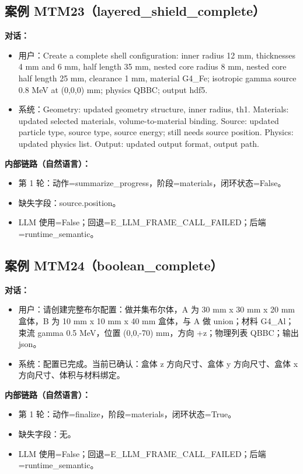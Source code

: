 \documentclass[11pt]{ctexart}
\begin{document}
\subsection{案例 MTM23（layered\_shield\_complete）}
\textbf{对话：}
\begin{itemize}
\item 用户：Create a complete shell configuration: inner radius 12 mm, thicknesses 4 mm and 6 mm, half length 35 mm, nested core radius 8 mm, nested core half length 25 mm, clearance 1 mm, material G4\_Fe; isotropic gamma source 0.8 MeV at (0,0,0) mm; physics QBBC; output hdf5.
\item 系统：Geometry: updated geometry structure, inner radius, th1. Materials: updated selected materials, volume-to-material binding. Source: updated particle type, source type, source energy; still needs source position. Physics: updated physics list. Output: updated output format, output path.
\end{itemize}
\textbf{内部链路（自然语言）：}
\begin{itemize}
\item 第 1 轮：动作=summarize\_progress，阶段=materials，闭环状态=False。
\item 缺失字段：source.position。
\item LLM 使用=False；回退=E\_LLM\_FRAME\_CALL\_FAILED；后端=runtime\_semantic。
\end{itemize}
\subsection{案例 MTM24（boolean\_complete）}
\textbf{对话：}
\begin{itemize}
\item 用户：请创建完整布尔配置：做并集布尔体，A 为 30 mm x 30 mm x 20 mm 盒体，B 为 10 mm x 10 mm x 40 mm 盒体，与 A 做 union；材料 G4\_Al；束流 gamma 0.5 MeV，位置 (0,0,-70) mm，方向 +z；物理列表 QBBC；输出 json。
\item 系统：配置已完成。当前已确认：盒体 z 方向尺寸、盒体 y 方向尺寸、盒体 x 方向尺寸、体积与材料绑定。
\end{itemize}
\textbf{内部链路（自然语言）：}
\begin{itemize}
\item 第 1 轮：动作=finalize，阶段=materials，闭环状态=True。
\item 缺失字段：无。
\item LLM 使用=False；回退=E\_LLM\_FRAME\_CALL\_FAILED；后端=runtime\_semantic。
\end{itemize}
\end{document}
